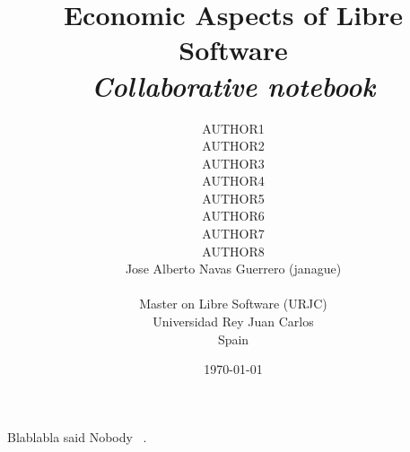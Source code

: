 \documentclass[10pt,a4paper,final]{report}
\title{\textbf{Economic Aspects of Libre Software}\\
		\emph{Collaborative notebook}}
\author{AUTHOR1\\
		AUTHOR2\\
		AUTHOR3\\
		AUTHOR4\\
		AUTHOR5\\
		AUTHOR6\\
		AUTHOR7\\
		AUTHOR8\\	
		Jose Alberto Navas Guerrero (janague)\\
		\\
        Master on Libre Software (URJC)\\
        Universidad Rey Juan Carlos\\
        Spain	\\
		}
\date{\today}
\begin{document}
\maketitle



\tableofcontents










Blablabla said Nobody ~\cite{Nobody06}.




\end{document}
